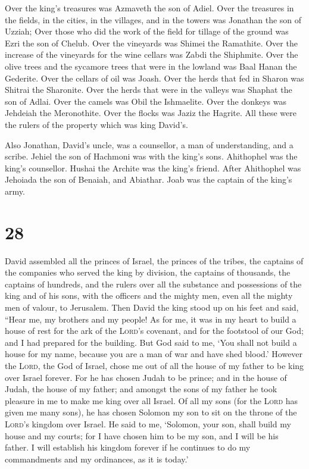  Over the king's treasures was Azmaveth the son of Adiel.
Over the treasures in the fields, in the cities, in the villages, and in
the towers was Jonathan the son of Uzziah;  Over those
who did the work of the field for tillage of the ground was Ezri the son
of Chelub.  Over the vineyards was Shimei the Ramathite.
Over the increase of the vineyards for the wine cellars was Zabdi the
Shiphmite.  Over the olive trees and the sycamore trees
that were in the lowland was Baal Hanan the Gederite. Over the cellars
of oil was Joash.  Over the herds that fed in Sharon was
Shitrai the Sharonite. Over the herds that were in the valleys was
Shaphat the son of Adlai.  Over the camels was Obil the
Ishmaelite. Over the donkeys was Jehdeiah the Meronothite. Over the
flocks was Jaziz the Hagrite.  All these were the rulers
of the property which was king David's.

 Also Jonathan, David's uncle, was a counsellor, a man of
understanding, and a scribe. Jehiel the son of Hachmoni was with the
king's sons.  Ahithophel was the king's counsellor.
Hushai the Archite was the king's friend.  After
Ahithophel was Jehoiada the son of Benaiah, and Abiathar. Joab was the
captain of the king's army.

\hypertarget{section-27}{%
\section{28}\label{section-27}}

 David assembled all the princes of Israel, the princes of
the tribes, the captains of the companies who served the king by
division, the captains of thousands, the captains of hundreds, and the
rulers over all the substance and possessions of the king and of his
sons, with the officers and the mighty men, even all the mighty men of
valour, to Jerusalem.  Then David the king stood up on his
feet and said, ``Hear me, my brothers and my people! As for me, it was
in my heart to build a house of rest for the ark of the \textsc{Lord}'s
covenant, and for the footstool of our God; and I had prepared for the
building.  But God said to me, `You shall not build a
house for my name, because you are a man of war and have shed blood.'
 However the \textsc{Lord}, the God of Israel, chose me
out of all the house of my father to be king over Israel forever. For he
has chosen Judah to be prince; and in the house of Judah, the house of
my father; and amongst the sons of my father he took pleasure in me to
make me king over all Israel.  Of all my sons (for the
\textsc{Lord} has given me many sons), he has chosen Solomon my son to
sit on the throne of the \textsc{Lord}'s kingdom over Israel.
 He said to me, `Solomon, your son, shall build my house
and my courts; for I have chosen him to be my son, and I will be his
father.  I will establish his kingdom forever if he
continues to do my commandments and my ordinances, as it is today.'

